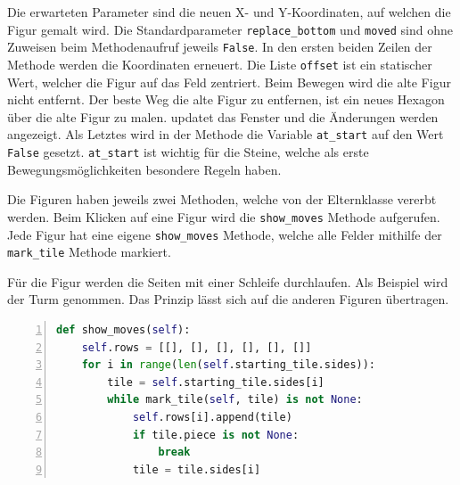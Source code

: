Die erwarteten Parameter sind die neuen X- und Y-Koordinaten, auf welchen die Figur gemalt wird. Die Standardparameter \texttt{replace\_bottom} und \texttt{moved} sind ohne Zuweisen beim Methodenaufruf jeweils \texttt{False}. In den ersten beiden Zeilen der Methode werden die Koordinaten erneuert. Die Liste \texttt{offset} ist ein statischer Wert, welcher die Figur auf das Feld zentriert. Beim Bewegen wird die alte Figur nicht entfernt. Der beste Weg die alte Figur zu entfernen, ist ein neues Hexagon über die alte Figur zu malen.  updatet das Fenster und die Änderungen werden angezeigt. Als Letztes wird in der Methode die Variable \texttt{at\_start} auf den Wert \texttt{False} gesetzt. \texttt{at\_start} ist wichtig für die Steine, welche als erste Bewegungsmöglichkeiten besondere Regeln haben.\par
Die Figuren haben jeweils zwei Methoden, welche von der Elternklasse vererbt werden. Beim Klicken auf eine Figur wird die \texttt{show\_moves} Methode aufgerufen. Jede Figur hat eine eigene \texttt{show\_moves} Methode, welche alle Felder mithilfe der \texttt{mark\_tile} Methode markiert.\par
Für die Figur werden die Seiten mit einer Schleife durchlaufen. Als Beispiel wird der Turm genommen. Das Prinzip lässt sich auf die anderen Figuren übertragen.

\begin{lstlisting}[language=python,caption={Figur zeige Bewegungsmöglichkeiten},captionpos=b,label={lst:hexa:show},numbers=left,frame=none,escapechar=|]
def show_moves(self):
    self.rows = [[], [], [], [], [], []]
    for i in range(len(self.starting_tile.sides)):
        tile = self.starting_tile.sides[i]
        while mark_tile(self, tile) is not None:
            self.rows[i].append(tile)
            if tile.piece is not None:
                break
            tile = tile.sides[i]

\end{lstlisting}

